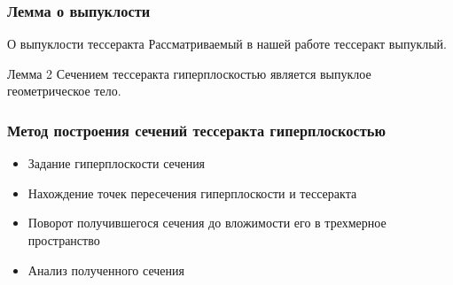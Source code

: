 \documentclass[10pt,pdf,hyperref={unicode}]{beamer}
\begin{document}
\begin{frame}
	\frametitle{Лемма о выпуклости}

	\begin{alertblock}{О выпуклости тессеракта}
		Рассматриваемый в нашей работе тессеракт выпуклый.
	\end{alertblock}

	\begin{block}{Лемма 2}
		Сечением тессеракта гиперплоскостью является выпуклое геометрическое тело.
	\end{block}
\end{frame}
\begin{frame}
	\frametitle{Метод построения сечений тессеракта гиперплоскостью}
	\begin{itemize}
		\item Задание гиперплоскости сечения
		\item Нахождение точек пересечения гиперплоскости и тессеракта
		\item Поворот получившегося сечения до вложимости его в трехмерное пространство
		\item Анализ полученного сечения
	\end{itemize}
\end{frame}
\end{document}
